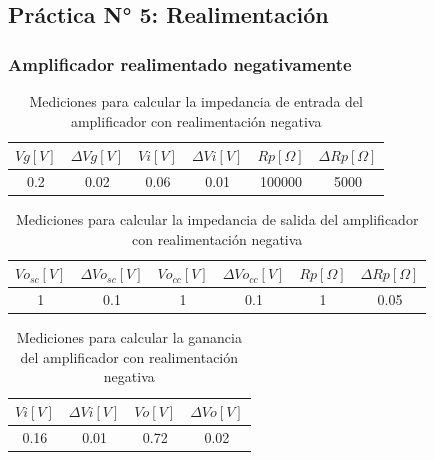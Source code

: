 \subsection{Práctica N° 5: Realimentación}

\subsubsection{Amplificador realimentado negativamente}

\begin{table}[h!]
\centering
\begin{tabular}{|c|c|c|c|c|c|}
\hline
\textbf{\(Vg[V]\)} & \textbf{\(\varDelta Vg[V]\)} & \textbf{\(Vi[V]\)} & \textbf{\(\varDelta Vi[V]\)} & \textbf{\(Rp[\Omega]\)} & \textbf{\(\varDelta Rp[\Omega]\)} \\ \hline
0.2 & 0.02 & 0.06 & 0.01 & 100000 & 5000 \\ \hline
\end{tabular}
\caption{Mediciones para calcular la impedancia de entrada del amplificador con realimentación negativa}
\label{tab:med-impedancia-entrada-amplificador-realimentacion-negativa}
\end{table}


\begin{table}[h!]
\centering
\begin{tabular}{|c|c|c|c|c|c|}
\hline
\textbf{\(Vo_{sc}[V]\)} & \textbf{\(\varDelta Vo_{sc}[V]\)} & \textbf{\(Vo_{cc}[V]\)} & \textbf{\(\varDelta Vo_{cc}[V]\)} & \textbf{\(Rp[\Omega]\)} & \textbf{\(\varDelta Rp[\Omega]\)} \\ \hline
1 & 0.1 & 1 & 0.1 & 1 & 0.05 \\ \hline
\end{tabular}
\caption{Mediciones para calcular la impedancia de salida del amplificador con realimentación negativa}
\label{tab:med-impedancia-salida-amplificador-realimentacion-negativa}
\end{table}

\begin{table}[h!]
\centering
\begin{tabular}{|c|c|c|c|}
\hline
\textbf{\(Vi[V]\)} & \textbf{\(\varDelta Vi[V]\)} & \textbf{\(Vo[V]\)} & \textbf{\(\varDelta Vo[V]\)} \\ \hline
0.16 & 0.01 & 0.72 & 0.02 \\ \hline
\end{tabular}
\caption{Mediciones para calcular la ganancia del amplificador con realimentación negativa}
\label{tab:med-ganancia-amplificador-realimentacion-negativa}
\end{table}

